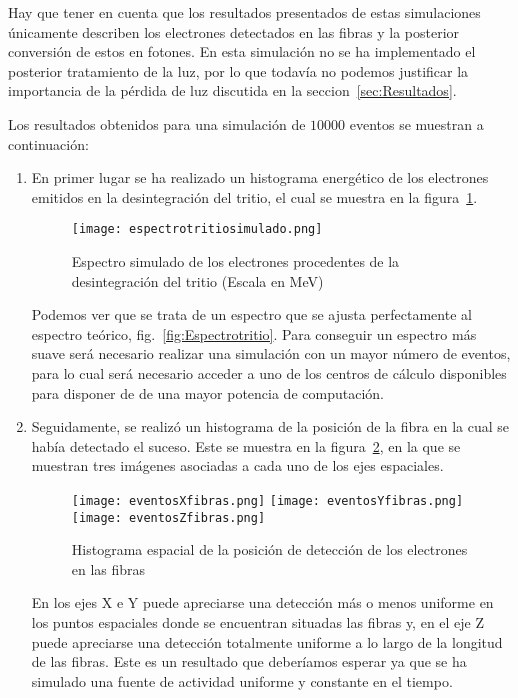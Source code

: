 Hay que tener en cuenta que los resultados presentados de estas simulaciones únicamente describen los electrones detectados en las fibras y la posterior conversión de estos en fotones. En esta simulación no se ha implementado el posterior tratamiento de la luz, por lo que todavía no podemos justificar la importancia de la pérdida de luz discutida en la seccion~\ref{sec:Resultados}.

Los resultados obtenidos para una simulación de $10000$ eventos se muestran a continuación:
\begin{enumerate}
\item{} En primer lugar se ha realizado un histograma energético de los electrones emitidos en la desintegración del tritio, el cual se muestra en la figura~\ref{espectrotritiosimuladonewpage}.

\begin{figure}[hbtp]
\centering
\texttt{[image: espectrotritiosimulado.png]}
\caption{Espectro simulado de los electrones procedentes de la desintegración del tritio (Escala en MeV)\label{espectrotritiosimuladonewpage}}
\end{figure}

Podemos ver que se trata de un espectro que se ajusta perfectamente al espectro teórico, fig.~\ref{fig:Espectrotritio}. Para conseguir un espectro más suave será necesario realizar una simulación con un mayor número de eventos, para lo cual será necesario acceder a uno de los centros  de cálculo disponibles para disponer de de una mayor potencia de computación.

\item{} Seguidamente, se realizó un histograma de la posición de la fibra en la cual se había detectado el suceso. Este se muestra en la  figura~\ref{espectroespacial}, en la que se muestran tres imágenes asociadas a cada uno de los ejes espaciales.

\begin{figure}[htb]
\centering
{
\texttt{[image: eventosXfibras.png]} 
}
{
\texttt{[image: eventosYfibras.png]} 
}
{
\texttt{[image: eventosZfibras.png]} 
}
\caption{Histograma espacial de la posición de detección de los electrones en las fibras\label{espectroespacial}}
\end{figure}

En los ejes X e Y puede apreciarse una detección más o menos uniforme en los puntos espaciales donde se encuentran situadas las fibras y, en el eje Z puede apreciarse una detección totalmente uniforme a lo largo de la longitud de las fibras. Este es un resultado que deberíamos esperar ya que se ha simulado una fuente de actividad uniforme y constante en el tiempo.


\end{enumerate}
